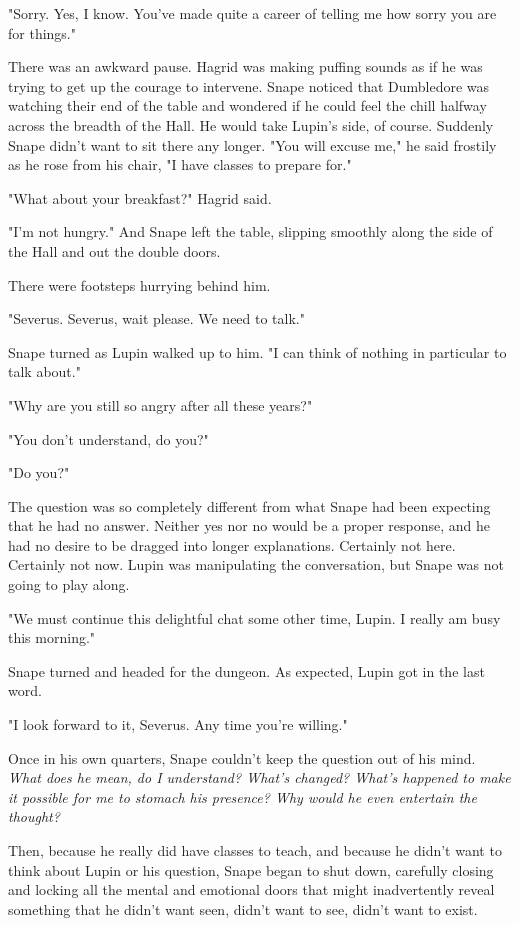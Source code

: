 "Sorry. Yes, I know. You've made quite a career of telling me how sorry you are for things."

There was an awkward pause. Hagrid was making puffing sounds as if he was trying to get up the courage to intervene. Snape noticed that Dumbledore was watching their end of the table and wondered if he could feel the chill halfway across the breadth of the Hall. He would take Lupin's side, of course. Suddenly Snape didn't want to sit there any longer. "You will excuse me," he said frostily as he rose from his chair, "I have classes to prepare for."

"What about your breakfast?" Hagrid said.

"I'm not hungry." And Snape left the table, slipping smoothly along the side of the Hall and out the double doors.

There were footsteps hurrying behind him.

"Severus. Severus, wait please. We need to talk."

Snape turned as Lupin walked up to him. "I can think of nothing in particular to talk about."

"Why are you still so angry after all these years?"

"You don't understand, do you?"

"Do you?"

The question was so completely different from what Snape had been expecting that he had no answer. Neither yes nor no would be a proper response, and he had no desire to be dragged into longer explanations. Certainly not here. Certainly not now. Lupin was manipulating the conversation, but Snape was not going to play along.

"We must continue this delightful chat some other time, Lupin. I really am busy this morning."

Snape turned and headed for the dungeon. As expected, Lupin got in the last word.

"I look forward to it, Severus. Any time you're willing."

Once in his own quarters, Snape couldn't keep the question out of his mind. \emph{What does he mean, do I understand? What's changed? What's happened to make it possible for me to stomach his presence? Why would he even entertain the thought?}

Then, because he really did have classes to teach, and because he didn't want to think about Lupin or his question, Snape began to shut down, carefully closing and locking all the mental and emotional doors that might inadvertently reveal something that he didn't want seen, didn't want to see, didn't want to exist.

